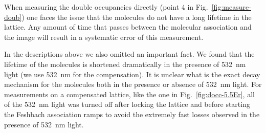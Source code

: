 When measuring the double occupancies directly (point $\boxed{4}$ in
Fig.~\ref{fig:measure-doub})  one faces the issue that the molecules do not
have a long lifetime in the lattice.   Any amount of time that passes between
the molecular association and the image will result in a systematic error of
this measurement.   

In the descriptions above we also omitted an important fact.  We found that the
lifetime of the molecules is shortened dramatically in the presence of 532~nm
light (we use 532~nm for the compensation).   It is unclear what is the exact
decay mechanism for the molecules both in the presence or absence of 532~nm
light.   For measurements on a compensated lattice, like the one in
Fig.~\ref{fig:docc-5.5Er},  all of the 532~nm light was turned off after
locking the lattice and before starting the Feshbach association ramps to avoid
the extremely fast losses observed in the presence of 532~nm light.  

